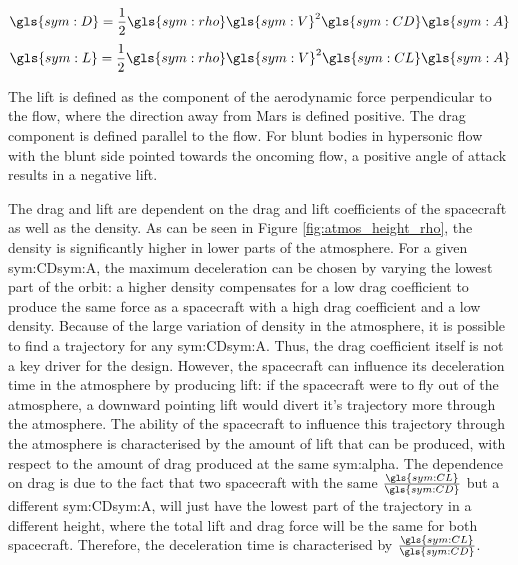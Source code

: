 \begin{equation} \label{eq:drag}
\gls{sym:D} = \frac{1}{2}\gls{sym:rho}\gls{sym:V}^2\gls{sym:CD}\gls{sym:A}
\end{equation}
\begin{equation} \label{eq:lift}
\gls{sym:L} = \frac{1}{2}\gls{sym:rho}\gls{sym:V}^2\gls{sym:CL}\gls{sym:A}
\end{equation}

The lift is defined as the component of the aerodynamic force perpendicular to the flow, where the direction away from Mars is defined positive. The drag component is defined parallel to the flow. For blunt bodies in hypersonic flow with the blunt side pointed towards the oncoming flow, a positive angle of attack results in a negative lift.

The drag and lift are dependent on the drag and lift coefficients of the spacecraft as well as the density. As can be seen in Figure \ref{fig:atmos_height_rho}, the density is significantly higher in lower parts of the atmosphere. For a given \gls{sym:CD}\gls{sym:A}, the maximum deceleration can be chosen by varying the lowest part of the orbit: a higher density compensates for a low drag coefficient to produce the same force as a spacecraft with a high drag coefficient and a low density. Because of the large variation of density in the atmosphere, it is possible to find a trajectory for any \gls{sym:CD}\gls{sym:A}. Thus, the drag coefficient itself is not a key driver for the design. However, the spacecraft can influence its deceleration time in the atmosphere by producing lift: if the spacecraft were to fly out of the atmosphere, a downward pointing lift would divert it's trajectory more through the atmosphere. The ability of the spacecraft to influence this trajectory through the atmosphere is characterised by the amount of lift that can be produced, with respect to the amount of drag produced at the same \gls{sym:alpha}. The dependence on drag is due to the fact that two spacecraft with the same $\frac{\gls{sym:CL}}{\gls{sym:CD}}$ but a different \gls{sym:CD}\gls{sym:A}, will just have the lowest part of the trajectory in a different height, where the total lift and drag force will be the same for both spacecraft. Therefore, the deceleration time is characterised by $\frac{\gls{sym:CL}}{\gls{sym:CD}}$. \\

